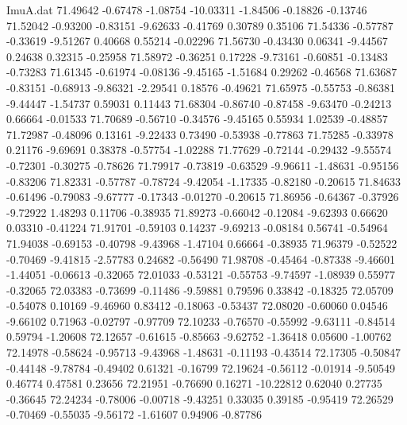 \begin{filecontents}{ImuA.dat}
  71.49642   -0.67478   -1.08754  -10.03311   -1.84506   -0.18826   -0.13746
  71.52042   -0.93200   -0.83151   -9.62633   -0.41769    0.30789    0.35106
  71.54336   -0.57787   -0.33619   -9.51267    0.40668    0.55214   -0.02296
  71.56730   -0.43430    0.06341   -9.44567    0.24638    0.32315   -0.25958
  71.58972   -0.36251    0.17228   -9.73161   -0.60851   -0.13483   -0.73283
  71.61345   -0.61974   -0.08136   -9.45165   -1.51684    0.29262   -0.46568
  71.63687   -0.83151   -0.68913   -9.86321   -2.29541    0.18576   -0.49621
  71.65975   -0.55753   -0.86381   -9.44447   -1.54737    0.59031    0.11443
  71.68304   -0.86740   -0.87458   -9.63470   -0.24213    0.66664   -0.01533
  71.70689   -0.56710   -0.34576   -9.45165    0.55934    1.02539   -0.48857
  71.72987   -0.48096    0.13161   -9.22433    0.73490   -0.53938   -0.77863
  71.75285   -0.33978    0.21176   -9.69691    0.38378   -0.57754   -1.02288
  71.77629   -0.72144   -0.29432   -9.55574   -0.72301   -0.30275   -0.78626
  71.79917   -0.73819   -0.63529   -9.96611   -1.48631   -0.95156   -0.83206
  71.82331   -0.57787   -0.78724   -9.42054   -1.17335   -0.82180   -0.20615
  71.84633   -0.61496   -0.79083   -9.67777   -0.17343   -0.01270   -0.20615
  71.86956   -0.64367   -0.37926   -9.72922    1.48293    0.11706   -0.38935
  71.89273   -0.66042   -0.12084   -9.62393    0.66620    0.03310   -0.41224
  71.91701   -0.59103    0.14237   -9.69213   -0.08184    0.56741   -0.54964
  71.94038   -0.69153   -0.40798   -9.43968   -1.47104    0.66664   -0.38935
  71.96379   -0.52522   -0.70469   -9.41815   -2.57783    0.24682   -0.56490
  71.98708   -0.45464   -0.87338   -9.46601   -1.44051   -0.06613   -0.32065
  72.01033   -0.53121   -0.55753   -9.74597   -1.08939    0.55977   -0.32065
  72.03383   -0.73699   -0.11486   -9.59881    0.79596    0.33842   -0.18325
  72.05709   -0.54078    0.10169   -9.46960    0.83412   -0.18063   -0.53437
  72.08020   -0.60060    0.04546   -9.66102    0.71963   -0.02797   -0.97709
  72.10233   -0.76570   -0.55992   -9.63111   -0.84514    0.59794   -1.20608
  72.12657   -0.61615   -0.85663   -9.62752   -1.36418    0.05600   -1.00762
  72.14978   -0.58624   -0.95713   -9.43968   -1.48631   -0.11193   -0.43514
  72.17305   -0.50847   -0.44148   -9.78784   -0.49402    0.61321   -0.16799
  72.19624   -0.56112   -0.01914   -9.50549    0.46774    0.47581    0.23656
  72.21951   -0.76690    0.16271  -10.22812    0.62040    0.27735   -0.36645
  72.24234   -0.78006   -0.00718   -9.43251    0.33035    0.39185   -0.95419
  72.26529   -0.70469   -0.55035   -9.56172   -1.61607    0.94906   -0.87786

\end{filecontents}

